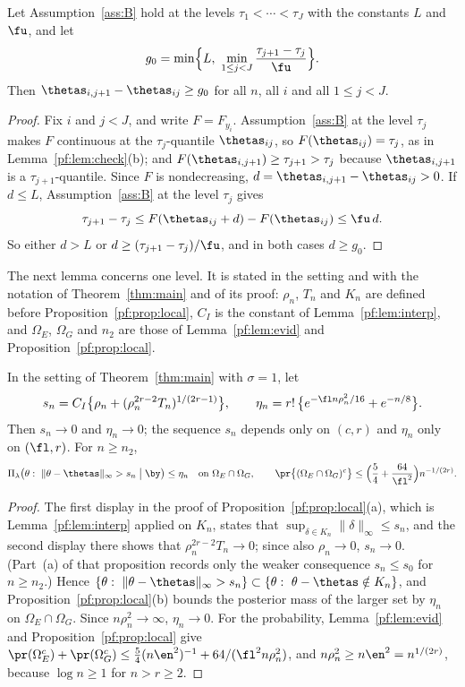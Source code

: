 \begin{lemma}[separation]\label{pf:lem:gap}
Let Assumption~\ref{ass:B} hold at the levels $\tau_1<\cdots<\tau_J$ with the constants $L$ and $\fu$, and let
\[
g_0=\min\Bigl\{L,\ \min_{1\le j<J}\frac{\tau_{j+1}-\tau_j}{\fu}\Bigr\}.
\]
Then $\thetas_{i,j+1}-\thetas_{ij}\ge g_0$ for all $n$, all $i$ and all $1\le j<J$.
\end{lemma}

\begin{proof}
Fix $i$ and $j<J$, and write $F=F_{y_i}$. Assumption~\ref{ass:B} at the level $\tau_j$ makes $F$ continuous at the $\tau_j$-quantile $\thetas_{ij}$, so $F(\thetas_{ij})=\tau_j$, as in Lemma~\ref{pf:lem:check}(b); and $F(\thetas_{i,j+1})\ge\tau_{j+1}>\tau_j$ because $\thetas_{i,j+1}$ is a $\tau_{j+1}$-quantile. Since $F$ is nondecreasing, $d=\thetas_{i,j+1}-\thetas_{ij}>0$. If $d\le L$, Assumption~\ref{ass:B} at the level $\tau_j$ gives
\[
\tau_{j+1}-\tau_j\le F(\thetas_{ij}+d)-F(\thetas_{ij})\le\fu\,d .
\]
So either $d>L$ or $d\ge(\tau_{j+1}-\tau_j)/\fu$, and in both cases $d\ge g_0$.
\end{proof}

The next lemma concerns one level. It is stated in the setting and with the notation of Theorem~\ref{thm:main} and of its proof: $\rho_n$, $T_n$ and $K_n$ are defined before Proposition~\ref{pf:prop:local}, $C_I$ is the constant of Lemma~\ref{pf:lem:interp}, and $\Omega_E$, $\Omega_G$ and $n_2$ are those of Lemma~\ref{pf:lem:evid} and Proposition~\ref{pf:prop:local}.

\begin{lemma}\label{pf:lem:sup}
In the setting of Theorem~\ref{thm:main} with $\sigma=1$, let
\[
s_n=C_I\bigl\{\rho_n+(\rho_n^{2r-2}T_n)^{1/(2r-1)}\bigr\},\qquad \eta_n=r!\,\bigl\{e^{-\fl n\rho_n^2/16}+e^{-n/8}\bigr\}.
\]
Then $s_n\to0$ and $\eta_n\to0$; the sequence $s_n$ depends only on $(c,r)$ and $\eta_n$ only on $(\fl,r)$. For $n\ge n_2$,
\[
\Pi_\lambda\bigl(\theta:\ \|\theta-\thetas\|_\infty>s_n\bigm|\by\bigr)\le\eta_n\quad\text{on }\Omega_E\cap\Omega_G,
\qquad
\pr\bigl\{(\Omega_E\cap\Omega_G)^c\bigr\}\le\Bigl(\frac54+\frac{64}{\fl^2}\Bigr)n^{-1/(2r)} .
\]
\end{lemma}

\begin{proof}
The first display in the proof of Proposition~\ref{pf:prop:local}(a), which is Lemma~\ref{pf:lem:interp} applied on $K_n$, states that $\sup_{\delta\in K_n}\|\delta\|_\infty\le s_n$, and the second display there shows that $\rho_n^{2r-2}T_n\to0$; since also $\rho_n\to0$, $s_n\to0$. (Part~(a) of that proposition records only the weaker consequence $s_n\le s_0$ for $n\ge n_2$.) Hence $\{\theta:\ \|\theta-\thetas\|_\infty>s_n\}\subset\{\theta:\ \theta-\thetas\notin K_n\}$, and Proposition~\ref{pf:prop:local}(b) bounds the posterior mass of the larger set by $\eta_n$ on $\Omega_E\cap\Omega_G$. Since $n\rho_n^2\to\infty$, $\eta_n\to0$. For the probability, Lemma~\ref{pf:lem:evid} and Proposition~\ref{pf:prop:local} give $\pr(\Omega_E^c)+\pr(\Omega_G^c)\le\tfrac54(n\en^2)^{-1}+64/(\fl^2n\rho_n^2)$, and $n\rho_n^2\ge n\en^2=n^{1/(2r)}$, because $\log n\ge1$ for $n>r\ge2$.
\end{proof}

